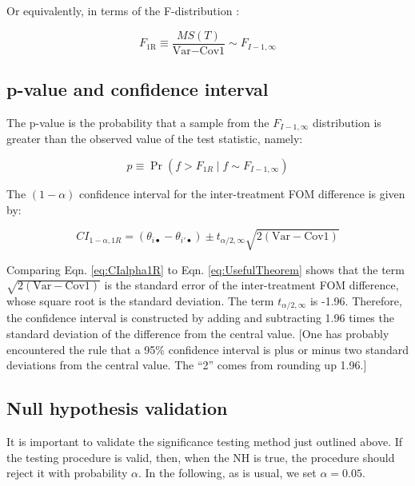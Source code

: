 \documentclass[
]{book}
\begin{document}
Or equivalently, in terms of the F-distribution \citep{RN1772}:

\begin{equation}
F_{\text{1R}} \equiv \frac{MS(T)}{\text{Var}-\text{Cov1}} \sim F_{I-1, \infty}
\label{eq:or-sampling-model-def-f-single-reader}
\end{equation}

\hypertarget{or-method-intro-pvalue-ci}{%
\subsection{p-value and confidence interval}\label{or-method-intro-pvalue-ci}}

The p-value is the probability that a sample from the \(F_{I-1,\infty}\) distribution is greater than the observed value of the test statistic, namely:

\begin{equation}
p\equiv \Pr(f>F_{1R} \mid f \sim F_{I-1,\infty})
\label{eq:pValue1RMT}
\end{equation}

The \((1-\alpha)\) confidence interval for the inter-treatment FOM difference is given by:

\begin{equation}
CI_{1-\alpha,1R} = (\theta_{i\bullet} - \theta_{i'\bullet}) \pm t_{\alpha/2,\infty} \sqrt{2(\text{Var}-\text{Cov1})}
\label{eq:CIalpha1R}
\end{equation}

Comparing Eqn. \eqref{eq:CIalpha1R} to Eqn. \eqref{eq:UsefulTheorem} shows that the term \(\sqrt{2(\text{Var}-\text{Cov1})}\) is the standard error of the inter-treatment FOM difference, whose square root is the standard deviation. The term \(t_{\alpha/2,\infty}\) is -1.96. Therefore, the confidence interval is constructed by adding and subtracting 1.96 times the standard deviation of the difference from the central value. {[}One has probably encountered the rule that a 95\% confidence interval is plus or minus two standard deviations from the central value. The ``2'' comes from rounding up 1.96.{]}

\hypertarget{or-method-intro-single-reader-nh-validation}{%
\subsection{Null hypothesis validation}\label{or-method-intro-single-reader-nh-validation}}

It is important to validate the significance testing method just outlined above. If the testing procedure is valid, then, when the NH is true, the procedure should reject it with probability \(\alpha\). In the following, as is usual, we set \(\alpha = 0.05\).
\end{document}
